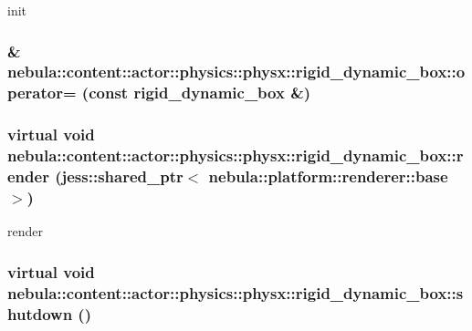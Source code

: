 init \hypertarget{classnebula_1_1content_1_1actor_1_1physics_1_1physx_1_1rigid__dynamic__box_a46578408f7f93646a86924261dbb8442}{
\subsubsection[{operator=}]{\& nebula::content::actor::physics::physx::rigid\_\-dynamic\_\-box::operator= (const {\bf rigid\_\-dynamic\_\-box} \&)}}
\label{classnebula_1_1content_1_1actor_1_1physics_1_1physx_1_1rigid__dynamic__box_a46578408f7f93646a86924261dbb8442}
\hypertarget{classnebula_1_1content_1_1actor_1_1physics_1_1physx_1_1rigid__dynamic__box_ad00353b6787484bdd2619f7294b82afb}{
\subsubsection[{render}]{\setlength{\rightskip}{0pt plus 5cm}virtual void nebula::content::actor::physics::physx::rigid\_\-dynamic\_\-box::render (jess::shared\_\-ptr$<$ {\bf nebula::platform::renderer::base} $>$)}}
\label{classnebula_1_1content_1_1actor_1_1physics_1_1physx_1_1rigid__dynamic__box_ad00353b6787484bdd2619f7294b82afb}


render \hypertarget{classnebula_1_1content_1_1actor_1_1physics_1_1physx_1_1rigid__dynamic__box_ae9b1ab77b71317d75e61ff1d1b14e4a1}{
\subsubsection[{shutdown}]{\setlength{\rightskip}{0pt plus 5cm}virtual void nebula::content::actor::physics::physx::rigid\_\-dynamic\_\-box::shutdown ()}}
\label{classnebula_1_1content_1_1actor_1_1physics_1_1physx_1_1rigid__dynamic__box_ae9b1ab77b71317d75e61ff1d1b14e4a1}


